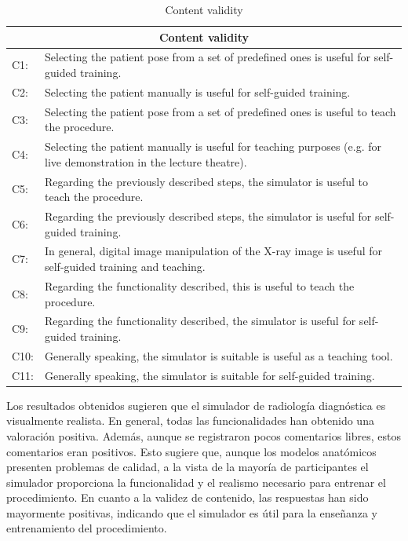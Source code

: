 \begin{table}[hb]
    \centering
    \begin{tabular}{lp{14cm}}
    \hline
    \multicolumn{2}{c}{Content validity }
    \\
    \hline
    C1:     &  Selecting the patient pose from a set of predefined ones is useful for self-guided training.  \\
    C2:     & Selecting the patient manually is useful for self-guided training.   \\
    C3:     & Selecting the patient pose from a set of predefined ones is useful to teach the procedure.   \\
    C4:     & Selecting the patient manually is useful for teaching purposes (e.g. for live demonstration in the lecture theatre).    \\
    C5:     &  Regarding the previously described steps, the simulator is useful to teach the procedure.  \\
    C6:     & Regarding the previously described steps, the simulator is useful for self-guided training.  \\
    C7:     & In general, digital image manipulation of the X-ray image is useful for self-guided training and teaching.  \\
    C8:     & Regarding the functionality described, this is useful to teach the procedure.   \\
    C9:     & Regarding the functionality described, the simulator is useful  for self-guided training.  \\
    C10:     & Generally speaking, the simulator is suitable is useful as a teaching tool.   \\
    C11:     & Generally speaking, the simulator is suitable for self-guided training.   \\
    \hline
    \end{tabular}
    \caption{Content validity}
    \label{tab:contentvalidity}
\end{table}

Los resultados obtenidos sugieren que el simulador de radiología diagnóstica es visualmente realista. En general, todas las funcionalidades han obtenido una valoración positiva. Además, aunque se registraron pocos comentarios libres, estos comentarios eran positivos. Esto sugiere que, aunque los modelos anatómicos presenten problemas de calidad, a la vista de la mayoría de participantes el simulador proporciona la funcionalidad y el realismo necesario para entrenar el procedimiento. En cuanto a la validez de contenido, las respuestas han sido mayormente positivas, indicando que el simulador es útil para la enseñanza y entrenamiento del procedimiento. 


